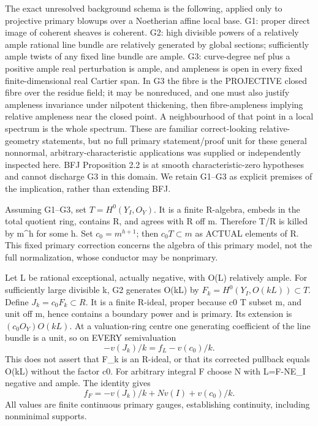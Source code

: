 \documentclass[11pt]{article}
\begin{document}
The exact unresolved background schema is the following, applied only to projective primary blowups over a Noetherian affine local base. G1: proper direct image of coherent sheaves is coherent. G2: high divisible powers of a relatively ample rational line bundle are relatively generated by global sections; sufficiently ample twists of any fixed line bundle are ample. G3: curve-degree nef plus a positive ample real perturbation is ample, and ampleness is open in every fixed finite-dimensional real Cartier span. In G3 the fibre is the PROJECTIVE closed fibre over the residue field; it may be nonreduced, and one must also justify ampleness invariance under nilpotent thickening, then fibre-ampleness implying relative ampleness near the closed point. A neighbourhood of that point in a local spectrum is the whole spectrum. These are familiar correct-looking relative-geometry statements, but no full primary statement/proof unit for these general nonnormal, arbitrary-characteristic applications was supplied or independently inspected here. BFJ Proposition 2.2 is at smooth characteristic-zero hypotheses and cannot discharge G3 in this domain. We retain G1--G3 as explicit premises of the implication, rather than extending BFJ.

Assuming G1--G3, set \(T=H^0(Y_I,O_Y)\). It is a finite R-algebra, embeds in the total quotient ring, contains R, and agrees with R off m. Therefore T/R is killed by m\textasciicircum{}h for some h. Set \(c_0=m^{h+1}\); then \(c_0T\subset m\) as ACTUAL elements of R. This fixed primary correction concerns the algebra of this primary model, not the full normalization, whose conductor may be nonprimary.

Let L be rational exceptional, actually negative, with O(L) relatively ample. For sufficiently large divisible k, G2 generates O(kL) by \(F_k=H^0(Y_I,O(kL))\subset T\). Define \(J_k=c_0F_k\subset R\). It is a finite R-ideal, proper because c0 T subset m, and unit off m, hence contains a boundary power and is primary. Its extension is \((c_0O_Y)O(kL)\). At a valuation-ring centre one generating coefficient of the line bundle is a unit, so on EVERY semivaluation
\[
 -v(J_k)/k=f_L-v(c_0)/k.
\]
This does not assert that F\_k is an R-ideal, or that its corrected pullback equals O(kL) without the factor c0. For arbitrary integral F choose N with L=F-NE\_I negative and ample. The identity gives
\[
 f_F=-v(J_k)/k+N v(I)+v(c_0)/k.
\]
All values are finite continuous primary gauges, establishing continuity, including nonminimal supports.
\end{document}
